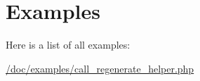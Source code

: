 \section{Examples}
Here is a list of all examples\-:\begin{DoxyCompactItemize}
\item 
\hyperlink{_2doc_2examples_2call_regenerate_helper_8php-example}{/doc/examples/call\-\_\-regenerate\-\_\-helper.\-php}
\end{DoxyCompactItemize}
